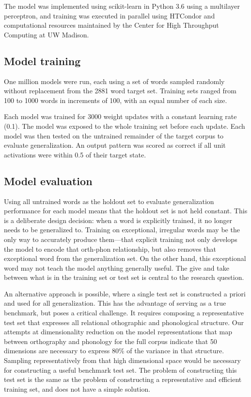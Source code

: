 \documentclass[10pt,letterpaper]{article}
\begin{document}
The model was implemented using scikit-learn in Python 3.6 using a multilayer perceptron, and training was executed in parallel using HTCondor \cite{Thain2005} and computational resources maintained by the Center for High Throughput Computing at UW Madison.  

\subsection{Model training}
One million models were run, each using a set of words sampled randomly without replacement from the 2881 word target set. Training sets ranged from 100 to 1000 words in increments of 100, with an equal number of each size.

Each model was trained for 3000 weight updates with a constant learning rate (0.1). The model was exposed to the whole training set before each update. Each model was then tested on the untrained remainder of the target corpus to evaluate generalization. An output pattern was scored as correct if all unit activations were within 0.5 of their target state.

\subsection{Model evaluation}
Using all untrained words as the holdout set to evaluate generalization performance for each model means that the holdout set is not held constant.
This is a deliberate design decision: when a word is explicitly trained, it no longer needs to be generalized to.
Training on exceptional, irregular words may be the only way to accurately produce them---that explicit training not only develops the model to encode that orth-phon relationship, but also removes that exceptional word from the generalization set.
On the other hand, this exceptional word may not teach the model anything generally useful.
The give and take between what is in the training set or test set is central to the research question.

An alternative approach is possible, where a single test set is constructed a priori and used for all generalization.
This has the advantage of serving as a true benchmark, but poses a critical challenge.
It requires composing a representative test set that expresses all relational othographic and phonological structure.
Our attempts at dimensionality reduction on the model representations that map between orthography and phonology for the full corpus indicate that 50 dimensions are necessary to express 80\% of the variance in that structure.
Sampling representatively from that high dimensional space would be necessary for constructing a useful benchmark test set.
The problem of constructing this test set is the same as the problem of constructing a representative and efficient training set, and does not have a simple solution.
\end{document}
